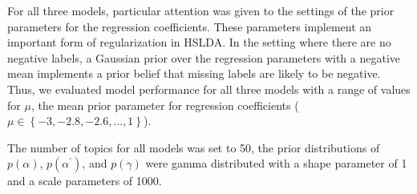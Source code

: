 
For all three models, particular attention was given to the settings of the 
prior parameters for the regression coefficients. These parameters implement an
important form of regularization in HSLDA. In the setting where there are no
negative labels, a Gaussian prior over the regression parameters with a
negative mean implements a prior belief that missing labels are likely to be
negative. Thus, we evaluated model performance for all three models with a
range of values for $\mu$, the mean prior parameter for regression coefficients 
($\mu\in\left\{ -3,-2.8,-2.6,\ldots,1\right\}$).

The number of topics for all models was set to 50, the prior distributions of
$p\left(\alpha\right)$, $p\left(\alpha^{\prime}\right)$, and
$p\left(\gamma\right)$ were gamma distributed with a shape parameter of 1 and a
scale parameters of 1000. 

